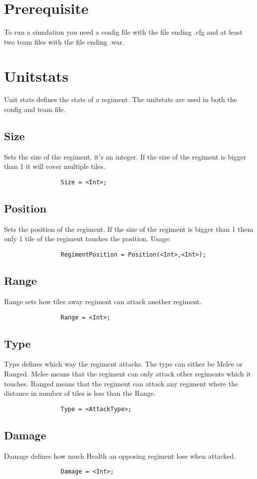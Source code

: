 \section{Prerequisite}
		To run a simulation you need a config file with the file ending .cfg and at least two team files
		with the file ending .war.
\section{Unitstats}
	Unit stats defines the stats of a regiment. The unitstats are used in both the config and team file.
		\subsection{Size}
			Sets the size of the regiment, it's an integer.
			If the size of the regiment is bigger than 1 it will cover multiple tiles.
			\begin{verbatim}
				Size = <Int>;
			\end{verbatim}
		\subsection{Position}
			Sets the position of the regiment. If the size of the regiment is bigger than 1 them 
			only 1 tile of the regiment touches the position. Usage: 
			\begin{verbatim}
				RegimentPosition = Position(<Int>,<Int>);
			\end{verbatim}
		\subsection{Range}
			Range sets how tiles away regiment can attack another regiment.
			\begin{verbatim}
				Range = <Int>;
			\end{verbatim}
		\subsection{Type}
			Type defines which way the regiment attacks. The type can either be Melee or Ranged.
			Melee means that the regiment can only attack other regiments which it touches. Ranged means 
			that the regiment can attack any regiment where the distance in number of tiles is less than the Range.
			\begin{verbatim}
				Type = <AttackType>; 
			\end{verbatim}	
		\subsection{Damage}
			Damage defines how much Health an opposing regiment lose when attacked.
			\begin{verbatim}
				Damage = <Int>;
			\end{verbatim}
